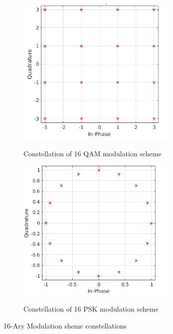 \documentclass[11pt]{report}
\begin{document}
\begin{figure}
	\centering
	
	\begin{subfigure}{.5\textwidth}
		\centering
		\includegraphics[width=0.85\textwidth]{resources/16QAM1.png}
		\label{fig:qam}
		\caption{Constellation of 16 QAM modulation scheme}
	\end{subfigure}%
	\begin{subfigure}{.5\textwidth}
		\setcounter{figure}{2}	
		\includegraphics[width=0.85\textwidth]{resources/16psk2.png}
		\label{fig:mpsk}
		\caption{Constellation of 16 PSK modulation scheme}
	\end{subfigure}

	\caption{16-Ary Modulation sheme constellations}
	\label{fig:qampsk}
	
\end{figure}{}
\end{document}
